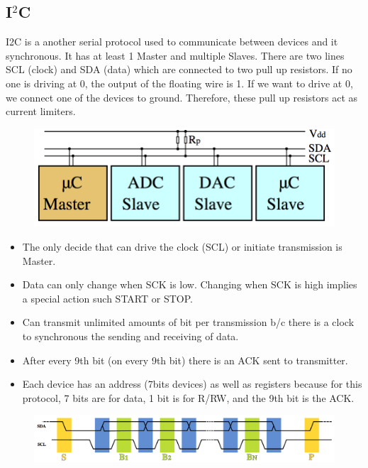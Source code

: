 \documentclass{hw}
\begin{document}
\subsection{I$^{2}$C}
I2C is a another serial protocol used to communicate between devices and it 
synchronous. It has at least 1 Master and multiple Slaves. There are two lines
SCL (clock) and SDA (data) which are connected to two pull up resistors. If no 
one is driving at 0, the output of the floating wire is 1. If we want to drive
at 0, we connect one of the devices to ground. Therefore, these pull up resistors
act as current limiters. 

\begin{figure}[H]
  \centering
  \includegraphics[scale=.5]{img/i2c}
\end{figure}

\begin{itemize}
  \item The only decide that can drive the clock (SCL) or initiate transmission 
    is Master.
  \item Data can only change when SCK is low. Changing when SCK is high implies
    a special action such START or STOP.
  \item Can transmit unlimited amounts of bit per transmission b/c there is a 
    clock to synchronous the sending and receiving of data.
  \item After every 9th bit (on every 9th bit) there is an ACK sent to 
    transmitter.
  \item Each device has an address (7bits  devices) as well as registers
    because for this protocol, 7 bits are for data, 1 bit is for R/RW, and the
    9th bit is the ACK.
\end{itemize}

\begin{figure}[H]
  \centering
  \includegraphics[scale=.45]{img/i2cdata}
\end{figure}
\end{document}
